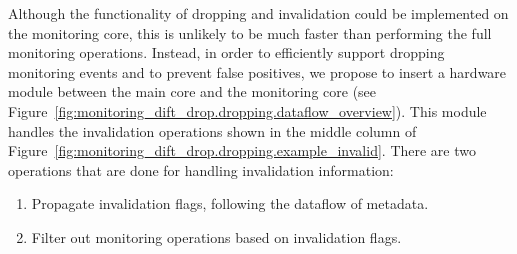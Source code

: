 Although the functionality of dropping and invalidation could be implemented on
the monitoring core, this is unlikely to be much faster than performing the full
monitoring operations.  Instead, in order to efficiently support dropping
monitoring events and to prevent false positives, we propose to insert a
hardware module between the main core and the monitoring core (see
Figure~\ref{fig:monitoring_dift_drop.dropping.dataflow_overview}).  This module
handles the invalidation operations shown in the middle column of
Figure~\ref{fig:monitoring_dift_drop.dropping.example_invalid}.  There are two
operations that are done for handling invalidation information:

\begin{enumerate}
  \item Propagate invalidation flags, following the dataflow of metadata.
  \item Filter out monitoring operations based on invalidation flags.
\end{enumerate}

